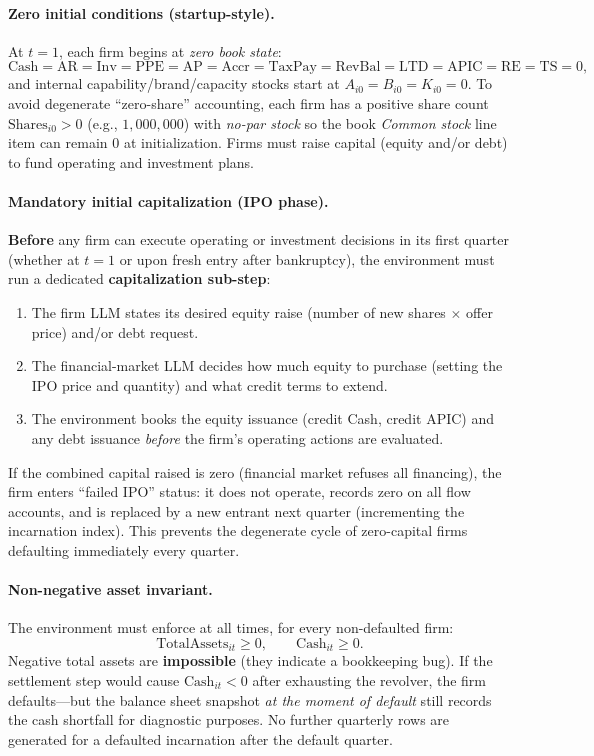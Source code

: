 \documentclass[11pt]{article}
\begin{document}
\paragraph{Zero initial conditions (startup-style).}
At $t=1$, each firm begins at \emph{zero book state}:
\[
\text{Cash}=\text{AR}=\text{Inv}=\text{PPE}=\text{AP}=\text{Accr}=\text{TaxPay}=\text{RevBal}=\text{LTD}=\text{APIC}=\text{RE}=\text{TS}=0,
\]
and internal capability/brand/capacity stocks start at $A_{i0}=B_{i0}=K_{i0}=0$.
To avoid degenerate ``zero-share'' accounting, each firm has a positive share count $\text{Shares}_{i0}>0$ (e.g., $1{,}000{,}000$) with \emph{no-par stock} so the book \emph{Common stock} line item can remain $0$ at initialization.
Firms must raise capital (equity and/or debt) to fund operating and investment plans.

\paragraph{Mandatory initial capitalization (IPO phase).}
\textbf{Before} any firm can execute operating or investment decisions in its first quarter (whether at $t=1$ or upon fresh entry after bankruptcy), the environment must run a dedicated \textbf{capitalization sub-step}:
\begin{enumerate}[leftmargin=*]
    \item The firm LLM states its desired equity raise (number of new shares $\times$ offer price) and/or debt request.
    \item The financial-market LLM decides how much equity to purchase (setting the IPO price and quantity) and what credit terms to extend.
    \item The environment books the equity issuance (credit Cash, credit APIC) and any debt issuance \emph{before} the firm's operating actions are evaluated.
\end{enumerate}
If the combined capital raised is zero (financial market refuses all financing), the firm enters ``failed IPO'' status: it does not operate, records zero on all flow accounts, and is replaced by a new entrant next quarter (incrementing the incarnation index). This prevents the degenerate cycle of zero-capital firms defaulting immediately every quarter.

\paragraph{Non-negative asset invariant.}
The environment must enforce at all times, for every non-defaulted firm:
\[
\text{TotalAssets}_{it} \ge 0, \qquad \text{Cash}_{it}\ge 0.
\]
Negative total assets are \textbf{impossible} (they indicate a bookkeeping bug).  If the settlement step would cause $\text{Cash}_{it}<0$ after exhausting the revolver, the firm defaults---but the balance sheet snapshot \emph{at the moment of default} still records the cash shortfall for diagnostic purposes. No further quarterly rows are generated for a defaulted incarnation after the default quarter.
\end{document}
